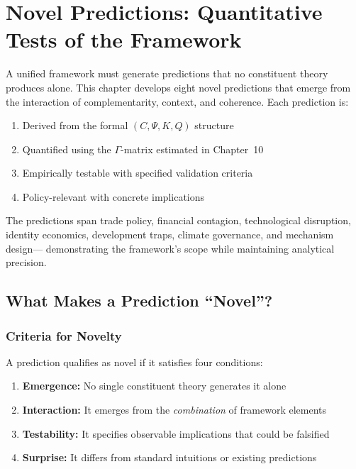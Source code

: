 \section{Novel Predictions: Quantitative Tests of the Framework}
\label{sec:predictions}


A unified framework must generate predictions that no constituent theory 
produces alone. This chapter develops eight novel predictions that emerge 
from the interaction of complementarity, context, and coherence. Each 
prediction is:
\begin{enumerate}
  \item Derived from the formal $(C, \Psi, K, Q)$ structure
  \item Quantified using the $\Gamma$-matrix estimated in Chapter~10
  \item Empirically testable with specified validation criteria
  \item Policy-relevant with concrete implications
\end{enumerate}

The predictions span trade policy, financial contagion, technological disruption,
identity economics, development traps, climate governance, and mechanism design---
demonstrating the framework's scope while maintaining analytical precision.

\subsection{What Makes a Prediction ``Novel''?}

\subsubsection{Criteria for Novelty}

A prediction qualifies as novel if it satisfies four conditions:

\begin{enumerate}
  \item \textbf{Emergence:} No single constituent theory generates it alone
  \item \textbf{Interaction:} It emerges from the \emph{combination} of framework elements
  \item \textbf{Testability:} It specifies observable implications that could be falsified
  \item \textbf{Surprise:} It differs from standard intuitions or existing predictions
\end{enumerate}

